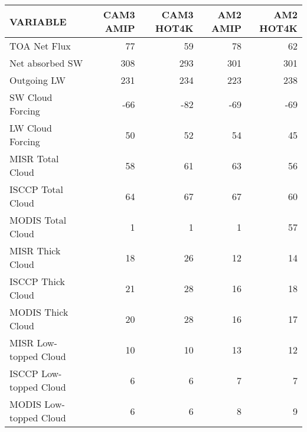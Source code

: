 \begin{tabular}{lrrrr}
\hline
                VARIABLE &                CAM3 AMIP &               CAM3 HOT4K &                 AM2 AMIP &                AM2 HOT4K \\ \hline
            TOA Net Flux &                       77 &                       59 &                       78 &                       62 \\
         Net absorbed SW &                      308 &                      293 &                      301 &                      301 \\
             Outgoing LW &                      231 &                      234 &                      223 &                      238 \\
        SW Cloud Forcing &                      -66 &                      -82 &                      -69 &                      -69 \\
        LW Cloud Forcing &                       50 &                       52 &                       54 &                       45 \\
        MISR Total Cloud &                       58 &                       61 &                       63 &                       56 \\
       ISCCP Total Cloud &                       64 &                       67 &                       67 &                       60 \\
       MODIS Total Cloud &                        1 &                        1 &                        1 &                       57 \\
        MISR Thick Cloud &                       18 &                       26 &                       12 &                       14 \\
       ISCCP Thick Cloud &                       21 &                       28 &                       16 &                       18 \\
       MODIS Thick Cloud &                       20 &                       28 &                       16 &                       17 \\
   MISR Low-topped Cloud &                       10 &                       10 &                       13 &                       12 \\
  ISCCP Low-topped Cloud &                        6 &                        6 &                        7 &                        7 \\
  MODIS Low-topped Cloud &                        6 &                        6 &                        8 &                        9 \\

\end{tabular}
